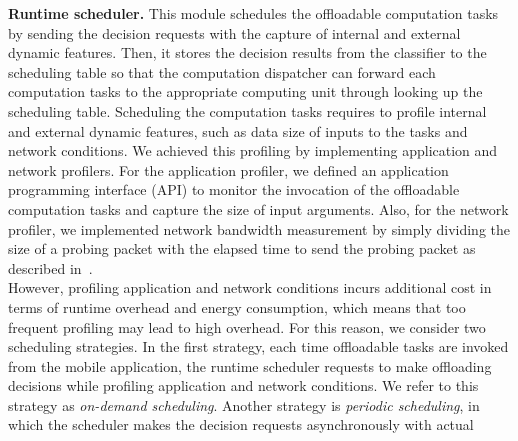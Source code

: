 \documentclass[10pt, conference, compsocconf]{IEEEtran}
\begin{document}
{{%
%
%
%
%
\indent \textbf{Runtime scheduler.} This module schedules the offloadable
computation tasks by sending the decision requests with the capture of
internal and external dynamic features.
%
Then, it stores the decision results from the classifier to the
scheduling table so that the computation dispatcher can forward each
computation tasks to the appropriate computing unit through looking up
the scheduling table.
%
Scheduling the computation tasks requires to profile internal
and external dynamic features, such as data size of inputs to the tasks
and network conditions. 
%
We achieved this profiling by implementing application and network
profilers.
%
For the application profiler, we defined an application programming
interface (API) to monitor the invocation of the offloadable computation
tasks and capture the size of input arguments.
%
Also, for the network profiler, we implemented network bandwidth
measurement by simply dividing the size of a probing packet with the elapsed
time to send the probing packet as described in~\cite{nws}.\\
%
\indent However, profiling application and network conditions incurs
additional cost in terms of runtime overhead and energy consumption,
which means that too frequent profiling may lead to high overhead.
%
For this reason, we consider two scheduling strategies.
%
In the first strategy, each time offloadable tasks are invoked from the
mobile application, the runtime scheduler requests to make offloading
decisions while profiling application and network conditions.
%
We refer to this strategy as \textit{on-demand scheduling}.
%
Another strategy is \textit{periodic scheduling}, in which the
scheduler makes the decision requests asynchronously with actual
}}
\end{document}
